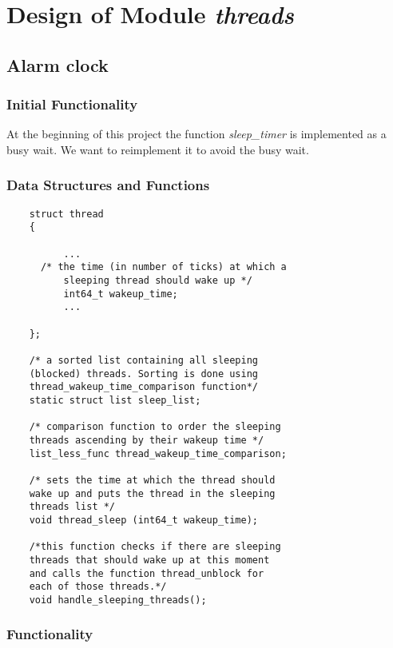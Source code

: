 
\chapter{Design of Module \textit{threads}}

\section{Alarm clock}

    \subsection{Initial Functionality}

	At the beginning of this project the function \textit{sleep\_timer} is implemented as a busy wait. We want to reimplement it to avoid the busy wait.

    \subsection{Data Structures and Functions}

    \begin{lstlisting}
	struct thread
	{

	      ...
	  /* the time (in number of ticks) at which a 
	      sleeping thread should wake up */
	      int64_t wakeup_time;		
	      ...

	};
	
	/* a sorted list containing all sleeping 
	(blocked) threads. Sorting is done using 
	thread_wakeup_time_comparison function*/
	static struct list sleep_list;

	/* comparison function to order the sleeping
	threads ascending by their wakeup time */
	list_less_func thread_wakeup_time_comparison;

	/* sets the time at which the thread should 
	wake up and puts the thread in the sleeping 
	threads list */
	void thread_sleep (int64_t wakeup_time);

	/*this function checks if there are sleeping
	threads that should wake up at this moment 
	and calls the function thread_unblock for 
	each of those threads.*/
	void handle_sleeping_threads();    
    \end{lstlisting}


    \subsection{Functionality}


